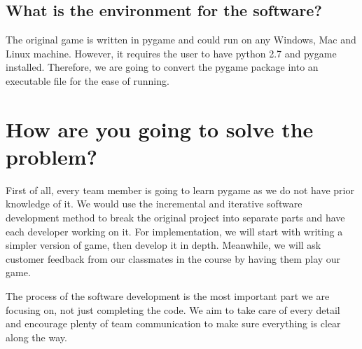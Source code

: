 \documentclass[12pt]{article}
\begin{document}
    \subsection {What is the environment for the software?}
    The original game is written in pygame and could run on any Windows, Mac and Linux machine. However, it requires the user to have python 2.7 and pygame installed. Therefore, we are going to convert the pygame package into an executable file for the ease of running.

\section{How are you going to solve the problem?}
First of all, every team member is going to learn pygame as we do not have prior knowledge of it. We would use the incremental and iterative software development method to break the original project into separate parts and have each developer working on it. For implementation, we will start with writing a simpler version of game, then develop it in depth. Meanwhile, we will ask customer feedback from our classmates in the course by having them play our game.

The process of the software development is the most important part we are focusing on, not just completing the code. We aim to take care of every detail and encourage plenty of team communication to make sure everything is clear along the way.
\end{document}
